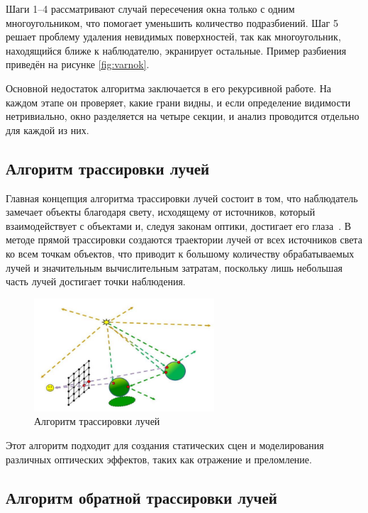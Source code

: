 Шаги 1–4 рассматривают случай пересечения окна только с одним многоугольником, что помогает уменьшить количество подразбиений. Шаг 5 решает проблему удаления невидимых поверхностей, так как многоугольник, находящийся ближе к наблюдателю, экранирует остальные. Пример разбиения приведён на рисунке \ref{fig:varnok}.

Основной недостаток алгоритма заключается в его рекурсивной работе. На каждом этапе он проверяет, какие грани видны, и если определение видимости нетривиально, окно разделяется на четыре секции, и анализ проводится отдельно для каждой из них.

\subsection{Алгоритм трассировки лучей}

Главная концепция алгоритма трассировки лучей состоит в том, что наблюдатель замечает объекты благодаря свету, исходящему от источников, который взаимодействует с объектами и, следуя законам оптики, достигает его глаза~\cite{lit5}. В методе прямой трассировки создаются траектории лучей от всех источников света ко всем точкам объектов, что приводит к большому количеству обрабатываемых лучей и значительным вычислительным затратам, поскольку лишь небольшая часть лучей достигает точки наблюдения. 

\begin{figure}[h] 
	\centering
	\includegraphics[width=0.6\textwidth]{images/direct-ray-tracing.png}
	\caption{Алгоритм трассировки лучей} 
	\label{fig:direct-ray-tracing} 
\end{figure}

Этот алгоритм подходит для создания статических сцен и моделирования различных оптических эффектов, таких как отражение и преломление.

\subsection{Алгоритм обратной трассировки лучей}

